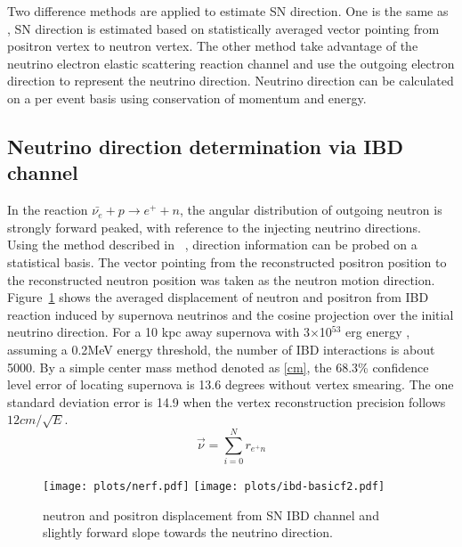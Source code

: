\documentclass[a4paper,10pt]{cpc-hepnp}
\begin{document}
Two difference methods are applied to estimate SN direction. 
One is the same as \cite{nudir}, SN direction is estimated based 
on statistically averaged vector pointing from positron vertex
to neutron vertex. %
The other method take advantage of the neutrino electron elastic
scattering reaction channel and use the outgoing electron direction
to represent the neutrino direction. 
Neutrino direction can be calculated on a per event basis using 
conservation of momentum and energy.

\subsection{ Neutrino direction determination via IBD channel}
\label{sec:intro}
In the reaction $\bar{\nu_{e}}+p \rightarrow e^{+}+n$, the
angular distribution of outgoing neutron is strongly forward peaked, with
reference to the injecting neutrino directions. Using the method described in
~\cite{chooz}, direction information can be probed on a  statistical basis.
The vector pointing from the reconstructed positron position to the
reconstructed neutron position was taken as the neutron motion direction.
Figure~\ref{ibd-basicplot} shows the averaged displacement of neutron and
positron from IBD reaction induced by supernova neutrinos and the cosine
projection over the initial neutrino direction.
For a 10 kpc away supernova with 3$\times$10$^53$ erg energy , assuming a 
0.2MeV energy threshold, the number of IBD interactions is about 5000.
By a simple center mass method denoted as \eqref{cm},
the 68.3\% confidence level error of locating supernova is 13.6 degrees without
vertex smearing. The one standard deviation error is 14.9 when the vertex
reconstruction precision follows $12cm/\sqrt{E}$.
\begin{equation}
\label{cm}
\vec{\nu} = \sum_{i=0}^{N}r_{e^{+}n}
\end{equation}

\begin{figure}[htbp]
\centering %
\texttt{[image: plots/nerf.pdf]}
\hfill
\texttt{[image: plots/ibd-basicf2.pdf]}
\caption{\label{ibd-basicplot} neutron and positron displacement from SN IBD
channel and slightly forward slope towards the neutrino direction.}
\end{figure}
\end{document}
